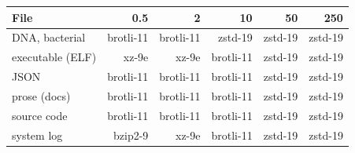 \begin{tabular}{@{}lrrrrr@{}}
\toprule
File & 0.5 & 2 & 10 & 50 & 250 \\
\midrule
DNA, bacterial & brotli-11 & brotli-11 & zstd-19 & zstd-19 & zstd-19 \\
executable (ELF) & xz-9e & xz-9e & brotli-11 & zstd-19 & zstd-19 \\
JSON & brotli-11 & brotli-11 & brotli-11 & zstd-19 & zstd-19 \\
prose (docs) & brotli-11 & brotli-11 & brotli-11 & zstd-19 & zstd-19 \\
source code & brotli-11 & brotli-11 & brotli-11 & zstd-19 & zstd-19 \\
system log & bzip2-9 & xz-9e & brotli-11 & zstd-19 & zstd-19 \\
\bottomrule
\end{tabular}

